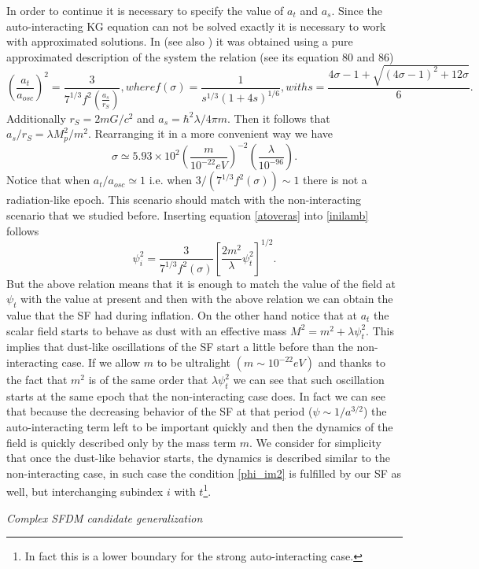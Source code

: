 \documentclass[amssymb,twocolumn,prd,nofootinbib,showpacs]{revtex4-1}
\begin{document}
\begin{itemize}
In order to continue it is necessary to specify the value of $a_t$ and $a_s$. Since the auto-interacting KG equation can not be solved exactly it is necessary to work with approximated solutions. In \cite{SFphi42} (see also \cite{SFphi41}) it was obtained using a pure approximated description of the system the relation (see its equation 80 and 86)
\begin{subequations}
\begin{equation}\label{atoveras}
\left(\frac{a_t}{a_{osc}}\right)^2=\frac{3}{7^{1/3}f^2(\frac{a_s}{r_S})},
\end{equation}
where 
\begin{equation}
f(\sigma)=\frac{1}{s^{1/3}(1+4s)^{1/6}},
\end{equation}
with
\begin{equation}
s=\frac{4\sigma-1+\sqrt{(4\sigma-1)^2+12\sigma}}{6}.
\end{equation}
\end{subequations}
Additionally $r_S=2mG/c^2$ and $a_s=\hbar^2\lambda/4\pi m$. Then it follows that $a_s/r_S=\lambda M_p^2/m^2$. Rearranging it in a more convenient way we have
\begin{equation}
\sigma \simeq 5.93\times 10^{
2}\left(\frac{m}{10^{-22}eV}\right)^{-2}\left(\frac{\lambda}{10^{-96}}\right).
\end{equation}
Notice that when $a_t/a_{osc}\simeq 1$ i.e. when $3/(7^{1/3}f^2(\sigma))\sim 1$ there is not a radiation-like epoch. This scenario should match with the non-interacting scenario that we studied before. Inserting equation \eqref{atoveras} into \eqref{inilamb} follows
\begin{equation}\label{inilamb2}
\psi_i^2=\frac{3}{7^{1/3}f^2(\sigma)}\left[\frac{2m^2}{\lambda}\psi_t^2\right]^{1/2}.
\end{equation}
But the above relation means that it is enough to match the value of the field at $\psi_t$ with the value at present and then with the above relation we can obtain the value that the SF had during inflation. On the other hand notice that at $a_t$ the scalar field starts to behave as dust with an effective mass $M^2=m^2+\lambda\psi_t^2$. This implies that dust-like oscillations of the SF start a little before than the non-interacting case. If we allow $m$ to be ultralight $(m\sim 10^{-22}eV)$ and thanks to the fact that $m^2$ is of the same order that $\lambda\psi_t^2$ we can see that such oscillation starts at the same epoch that the non-interacting case does. In fact we can see that because the decreasing behavior of the SF at that period ($\psi\sim 1/a^{3/2}$) the auto-interacting term left to be important quickly and then the dynamics of the field is quickly described only by the mass term $m$. We consider for simplicity that once the dust-like behavior starts, the dynamics is described similar to  the non-interacting case, in such case the condition \eqref{phi_im2} is fulfilled by our SF as well, but interchanging subindex $i$ with $t$\footnote{In fact this is a lower boundary for the strong auto-interacting case.}.
\end{itemize}
\begin{center}
\textit{Complex SFDM candidate generalization}
\end{center}
\end{document}
